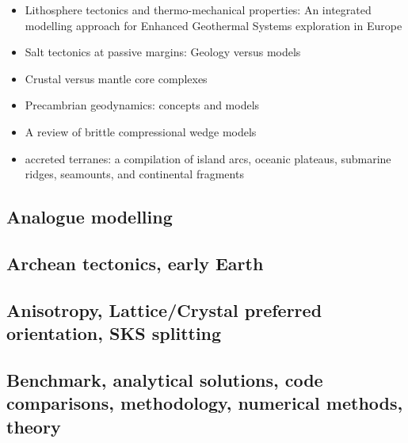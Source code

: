 \begin{itemize}
\item Lithosphere tectonics and thermo-mechanical properties: An integrated modelling
approach for Enhanced Geothermal Systems exploration in Europe \cite{clvz10}
\item Salt tectonics at passive margins: Geology versus models \cite{brfo11}
\item Crustal versus mantle core complexes \cite{brst18}
\item Precambrian geodynamics: concepts and models \cite{gery14}
\item A review of brittle compressional wedge models \cite{buit12}
\item accreted terranes: a compilation of island arcs, oceanic
plateaus, submarine ridges, seamounts, and continental fragments \cite{tebu14}
\end{itemize}

\subsection*{Analogue modelling}

\noindent
\cite{nabr93}
\cite{haki01}
\cite{jujb05}
\cite{clbz08}\cite{fufh08}
\cite{casw15}\cite{rods15}
\cite{casw17}
\cite{pirf18}
\cite{mocb19}\cite{sccs19}

\subsection*{Archean tectonics, early Earth}

\noindent
\cite{canc19}\cite{gery19}

\subsection*{Anisotropy, Lattice/Crystal preferred orientation, SKS splitting}

\noindent
\cite{mudm02}
\cite{mumc03}
\cite{mumc04}
\cite{besb06}
\cite{faca13}
\cite{facc14}

\subsection*{Benchmark, analytical solutions, code comparisons, methodology, numerical methods, theory}

